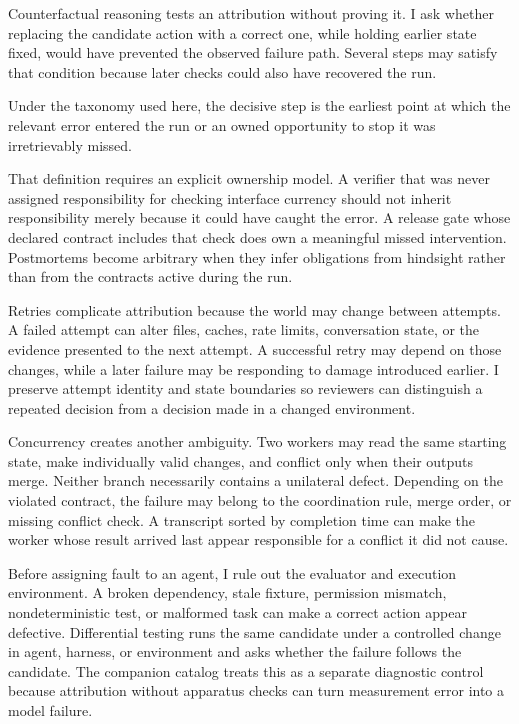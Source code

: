 Counterfactual reasoning tests an attribution without proving it. I ask whether replacing the candidate action with a correct one, while holding earlier state fixed, would have prevented the observed failure path. Several steps may satisfy that condition because later checks could also have recovered the run.

Under the taxonomy used here, the decisive step is the earliest point at which the relevant error entered the run or an owned opportunity to stop it was irretrievably missed.

That definition requires an explicit ownership model. A verifier that was never assigned responsibility for checking interface currency should not inherit responsibility merely because it could have caught the error. A release gate whose declared contract includes that check does own a meaningful missed intervention. Postmortems become arbitrary when they infer obligations from hindsight rather than from the contracts active during the run.

Retries complicate attribution because the world may change between attempts. A failed attempt can alter files, caches, rate limits, conversation state, or the evidence presented to the next attempt. A successful retry may depend on those changes, while a later failure may be responding to damage introduced earlier. I preserve attempt identity and state boundaries so reviewers can distinguish a repeated decision from a decision made in a changed environment.

Concurrency creates another ambiguity. Two workers may read the same starting state, make individually valid changes, and conflict only when their outputs merge. Neither branch necessarily contains a unilateral defect. Depending on the violated contract, the failure may belong to the coordination rule, merge order, or missing conflict check. A transcript sorted by completion time can make the worker whose result arrived last appear responsible for a conflict it did not cause.

Before assigning fault to an agent, I rule out the evaluator and execution environment. A broken dependency, stale fixture, permission mismatch, nondeterministic test, or malformed task can make a correct action appear defective. Differential testing runs the same candidate under a controlled change in agent, harness, or environment and asks whether the failure follows the candidate. The companion catalog treats this as a separate diagnostic control because attribution without apparatus checks can turn measurement error into a model failure.

